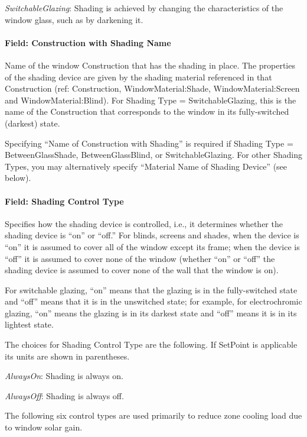 \emph{SwitchableGlazing}: Shading is achieved by changing the characteristics of the window glass, such as by darkening it.

\paragraph{Field: Construction with Shading Name}\label{field-construction-with-shading-name}

Name of the window Construction that has the shading in place. The properties of the shading device are given by the shading material referenced in that Construction (ref: Construction, WindowMaterial:Shade, WindowMaterial:Screen and WindowMaterial:Blind). For Shading Type = SwitchableGlazing, this is the name of the Construction that corresponds to the window in its fully-switched (darkest) state.

Specifying ``Name of Construction with Shading'' is required if Shading Type = BetweenGlassShade, BetweenGlassBlind, or SwitchableGlazing. For other Shading Types, you may alternatively specify ``Material Name of Shading Device'' (see below).

\paragraph{Field: Shading Control Type}\label{field-shading-control-type}

Specifies how the shading device is controlled, i.e., it determines whether the shading device is ``on'' or ``off.'' For blinds, screens and shades, when the device is ``on'' it is assumed to cover all of the window except its frame; when the device is ``off'' it is assumed to cover none of the window (whether ``on'' or ``off'' the shading device is assumed to cover none of the wall that the window is on).

For switchable glazing, ``on'' means that the glazing is in the fully-switched state and ``off'' means that it is in the unswitched state; for example, for electrochromic glazing, ``on'' means the glazing is in its darkest state and ``off'' means it is in its lightest state.

The choices for Shading Control Type are the following. If SetPoint is applicable its units are shown in parentheses.

\emph{AlwaysOn}: Shading is always on.

\emph{AlwaysOff}: Shading is always off.

The following six control types are used primarily to reduce zone cooling load due to window solar gain.

